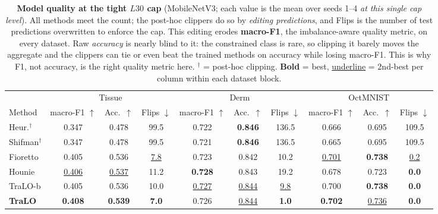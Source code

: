 \begin{table}[t]\centering\small
\caption{\textbf{Model quality at the tight $L30$ cap} (MobileNetV3; each value is the mean over seeds 1--4 \emph{at this single cap level}). All methods meet the count; the post-hoc clippers do so by \emph{editing predictions}, and Flips is the number of test predictions overwritten to enforce the cap. This editing erodes \textbf{macro-F1}, the imbalance-aware quality metric, on every dataset. Raw \emph{accuracy} is nearly blind to it: the constrained class is rare, so clipping it barely moves the aggregate and the clippers can tie or even beat the trained methods on accuracy while losing macro-F1. This is why F1, not accuracy, is the right quality metric here. $^{\dagger}$ = post-hoc clipping. \textbf{Bold} = best, \underline{underline} = 2nd-best per column within each dataset block.}
\label{tab:deploy}
\vspace{5pt}
\begin{tabular}{l ccc ccc ccc}
\toprule
 & \multicolumn{3}{c}{Tissue} & \multicolumn{3}{c}{Derm} & \multicolumn{3}{c}{OctMNIST} \\
\cmidrule(lr){2-4}\cmidrule(lr){5-7}\cmidrule(lr){8-10}
Method & macro-F1 $\uparrow$ & Acc.\ $\uparrow$ & Flips $\downarrow$ & macro-F1 $\uparrow$ & Acc.\ $\uparrow$ & Flips $\downarrow$ & macro-F1 $\uparrow$ & Acc.\ $\uparrow$ & Flips $\downarrow$ \\
\midrule
Heur.$^{\dagger}$  & 0.347 & 0.478 & 99.5 & 0.722 & \textbf{0.846} & 136.5 & 0.666 & 0.695 & 109.5 \\
Shifman$^{\dagger}$ & 0.347 & 0.478 & 99.5 & 0.721 & \textbf{0.846} & 136.5 & 0.665 & 0.695 & 109.5 \\
Fioretto           & 0.405 & 0.536 & \underline{7.8} & 0.723 & 0.842 & 10.2 & \underline{0.701} & \textbf{0.738} & \underline{0.2} \\
Hounie             & \underline{0.406} & \underline{0.537} & 11.2 & \textbf{0.728} & 0.843 & 19.2 & 0.678 & 0.723 & \textbf{0.0} \\
TraLO-b            & 0.405 & 0.536 & 10.0 & \underline{0.727} & \underline{0.844} & \underline{9.8} & 0.700 & \textbf{0.738} & \textbf{0.0} \\
\textbf{TraLO}     & \textbf{0.408} & \textbf{0.539} & \textbf{7.0} & 0.726 & \underline{0.844} & \textbf{1.0} & \textbf{0.702} & \underline{0.736} & \textbf{0.0} \\
\bottomrule
\end{tabular}
\end{table}
